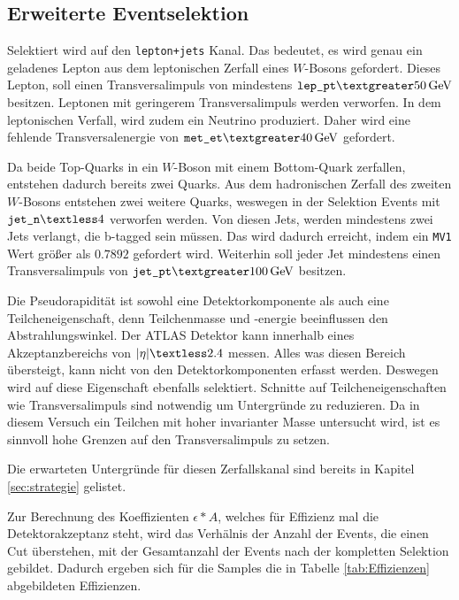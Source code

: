 \subsection{Erweiterte Eventselektion}

Selektiert wird auf den \texttt{lepton+jets} Kanal. Das bedeutet, es wird genau 
ein geladenes Lepton aus dem leptonischen Zerfall eines $W$-Bosons gefordert. 
Dieses Lepton, soll einen Transversalimpuls von mindestens $\texttt{lep$\_$pt} \textgreater 
\SI{50}{\giga\electronvolt}$ besitzen. Leptonen mit geringerem Transversalimpuls 
werden verworfen. In dem leptonischen Verfall, wird zudem ein 
Neutrino produziert. Daher wird eine fehlende Transversalenergie von 
$\texttt{met$\_$et} \textgreater \SI{40}{\giga\electronvolt}$ gefordert. \par 
Da beide Top-Quarks in ein $W$-Boson mit einem Bottom-Quark zerfallen, entstehen
dadurch bereits zwei Quarks. Aus dem hadronischen Zerfall des zweiten $W$-Bosons 
entstehen zwei weitere Quarks, weswegen in der Selektion Events mit 
$\texttt{jet$\_$n} \textless 4$ verworfen werden. Von diesen Jets, werden 
mindestens zwei Jets verlangt, die b-tagged sein müssen. Das wird dadurch erreicht,
indem ein \texttt{MV1} Wert größer als $0.7892$ gefordert wird. Weiterhin soll 
jeder Jet mindestens einen Transversalimpuls von $\texttt{jet$\_$pt} 
\textgreater \SI{100}{\giga\electronvolt}$ besitzen. \par 
Die Pseudorapidität ist sowohl eine Detektorkomponente als auch eine 
Teilcheneigenschaft, denn Teilchenmasse und -energie beeinflussen den 
Abstrahlungswinkel. Der ATLAS Detektor kann innerhalb eines Akzeptanzbereichs 
von $|{\eta}| \textless 2.4$ messen. Alles was diesen Bereich übersteigt, 
kann nicht von den Detektorkomponenten erfasst werden. Deswegen wird auf 
diese Eigenschaft ebenfalls selektiert. Schnitte auf Teilcheneigenschaften 
wie Transversalimpuls sind notwendig um Untergründe zu reduzieren. Da in diesem 
Versuch ein Teilchen mit hoher invarianter Masse untersucht wird, ist es 
sinnvoll hohe Grenzen auf den Transversalimpuls zu setzen. \par 

Die erwarteten Untergründe für diesen Zerfallskanal sind bereits in 
Kapitel \ref{sec:strategie} gelistet. \par

Zur Berechnung des Koeffizienten $\epsilon * A$, welches für Effizienz mal die 
Detektorakzeptanz steht, wird das Verhälnis der Anzahl der Events, die einen 
Cut überstehen, 
mit der Gesamtanzahl der Events nach der kompletten Selektion gebildet. Dadurch 
ergeben sich für die Samples die in Tabelle \ref{tab:Effizienzen} abgebildeten 
Effizienzen.

